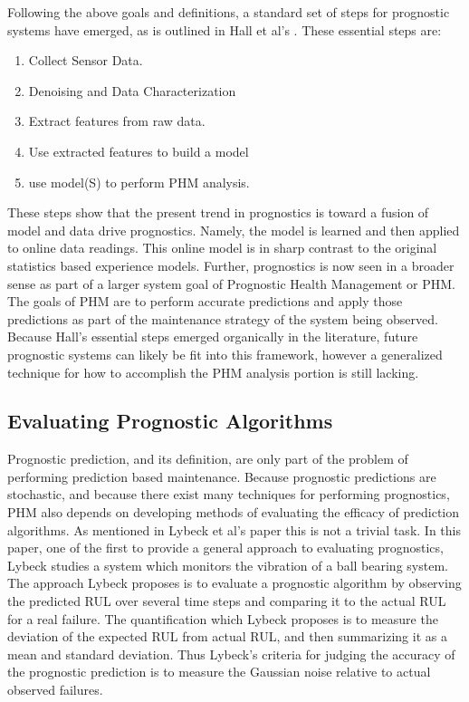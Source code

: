 \documentclass[12pt]{article}
\begin{document}
Following the above goals and definitions, a standard set of steps for
prognostic systems have emerged, as is outlined in Hall et al's
\cite{6024332}.  These essential steps are:
\begin{enumerate}
  \item Collect Sensor Data.
  \item Denoising and Data Characterization
  \item Extract features from raw data.
  \item Use extracted features to build a model
  \item use model(S) to perform PHM analysis.
\end{enumerate}
These steps show that the present trend in prognostics is toward a fusion of
model and data drive prognostics.  Namely, the model is learned and then
applied to online data readings.  This online model is in sharp contrast to the
original statistics based experience models.  Further, prognostics is now seen
in a broader sense as part of a larger system goal of Prognostic Health
Management or PHM.  The goals of PHM are to perform accurate predictions and
apply those predictions as part of the maintenance strategy of the system being
observed.  Because Hall's essential steps emerged organically in the
literature, future prognostic systems can likely be fit into this framework,
however a generalized technique for how to accomplish the PHM analysis portion
is still lacking.

\subsection{Evaluating Prognostic Algorithms}
Prognostic prediction, and its definition, are only part of the problem of
performing prediction based maintenance.  Because prognostic predictions are
stochastic, and because there exist many techniques for performing prognostics,
PHM also depends on developing methods of evaluating the efficacy of prediction
algorithms.  As mentioned in Lybeck et al's paper \cite{4161637} this is not a
trivial task.  In this paper, one of the first to provide a general approach to
evaluating prognostics, Lybeck studies a system which monitors the vibration of
a ball bearing system.  The approach Lybeck proposes is to evaluate a
prognostic algorithm by observing the predicted RUL over several time steps and
comparing it to the actual RUL for a real failure.  The quantification which
Lybeck proposes is to measure the deviation of the expected RUL from actual
RUL, and then summarizing it as a mean and standard deviation.  Thus Lybeck's
criteria for judging the accuracy of the prognostic prediction is to measure
the Gaussian noise relative to actual observed failures.  
\end{document}
